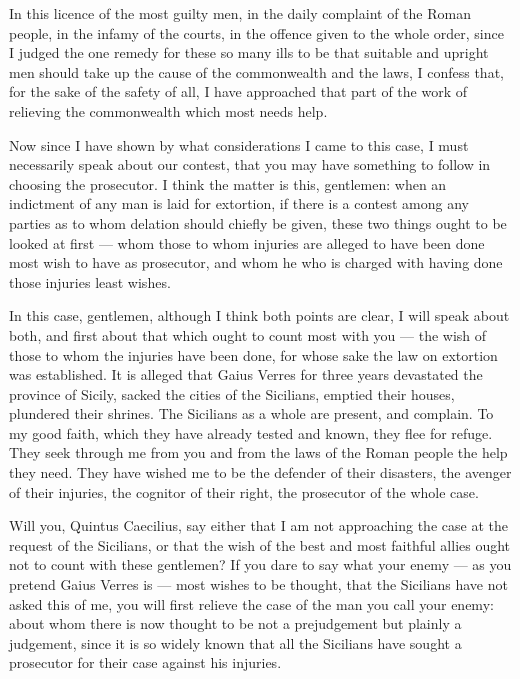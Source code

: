  In this licence of the most guilty men, in the daily complaint of the Roman people, in the infamy of the courts, in the offence given to the whole order, since I judged the one remedy for these so many ills to be that suitable and upright men should take up the cause of the commonwealth and the laws, I confess that, for the sake of the safety of all, I have approached that part of the work of relieving the commonwealth which most needs help.

 Now since I have shown by what considerations I came to this case, I must necessarily speak about our contest, that you may have something to follow in choosing the prosecutor. I think the matter is this, gentlemen: when an indictment of any man is laid for extortion, if there is a contest among any parties as to whom delation should chiefly be given, these two things ought to be looked at first --- whom those to whom injuries are alleged to have been done most wish to have as prosecutor, and whom he who is charged with having done those injuries least wishes.

 In this case, gentlemen, although I think both points are clear, I will speak about both, and first about that which ought to count most with you --- the wish of those to whom the injuries have been done, for whose sake the law on extortion was established. It is alleged that Gaius Verres for three years devastated the province of Sicily, sacked the cities of the Sicilians, emptied their houses, plundered their shrines. The Sicilians as a whole are present, and complain. To my good faith, which they have already tested and known, they flee for refuge. They seek through me from you and from the laws of the Roman people the help they need. They have wished me to be the defender of their disasters, the avenger of their injuries, the cognitor of their right, the prosecutor of the whole case.

 Will you, Quintus Caecilius, say either that I am not approaching the case at the request of the Sicilians, or that the wish of the best and most faithful allies ought not to count with these gentlemen? If you dare to say what your enemy --- as you pretend Gaius Verres is --- most wishes to be thought, that the Sicilians have not asked this of me, you will first relieve the case of the man you call your enemy: about whom there is now thought to be not a prejudgement but plainly a judgement, since it is so widely known that all the Sicilians have sought a prosecutor for their case against his injuries.

